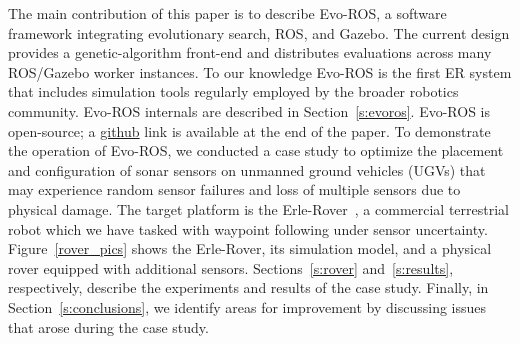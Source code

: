 The main contribution of this paper is to 
describe Evo-ROS, a software framework integrating evolutionary search, ROS, and Gazebo.  
The current design provides a genetic-algorithm front-end and 
distributes evaluations across many ROS/Gazebo worker instances.  
To our knowledge Evo-ROS is the first ER system that includes simulation tools regularly employed by the broader robotics community.
%
%
%
Evo-ROS internals are described in Section~\ref{s:evoros}. 
Evo-ROS is open-source; a \url{github} link is available at the end of the paper.
%
To demonstrate the operation of Evo-ROS, we conducted a case
study to optimize the 
placement and configuration of sonar sensors on unmanned ground vehicles (UGVs) that may
experience random sensor failures and loss of multiple sensors
due to physical damage.
The target platform is the Erle-Rover~\cite{erle.rover.main}, a commercial terrestrial robot which we 
have tasked with waypoint following under sensor uncertainty. 
%
Figure~\ref{rover_pics} shows the Erle-Rover, its simulation model, and a physical rover equipped with additional sensors. 
Sections~\ref{s:rover} and~\ref{s:results}, respectively, describe the experiments and results of the case study.
%
% 
%
%
%
%
% 
Finally, in Section~\ref{s:conclusions}, we identify areas for improvement by discussing issues that arose 
during the case study.
